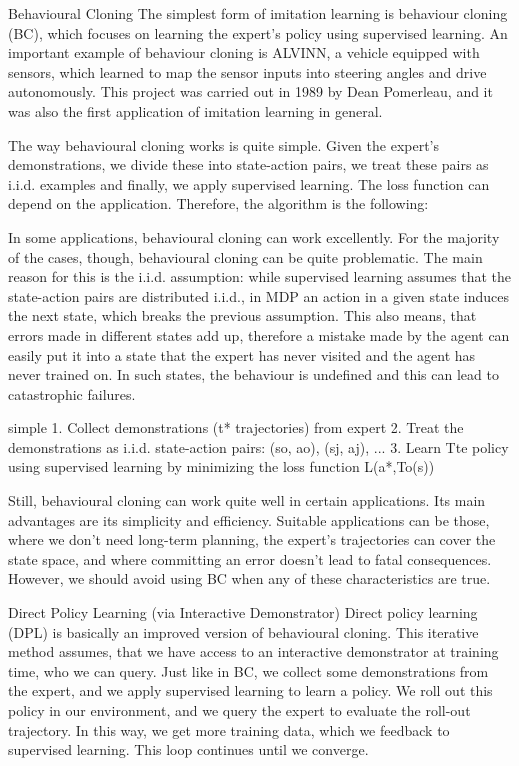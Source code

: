 \documentclass{article}
\begin{document}
Behavioural Cloning
The simplest form of imitation learning is behaviour cloning (BC), which focuses on learning the expert’s policy using supervised learning. An important example of behaviour cloning is ALVINN, a vehicle equipped with sensors, which learned to map the sensor inputs into steering angles and drive autonomously. This project was carried out in 1989 by Dean Pomerleau, and it was also the first application of imitation learning in general.

The way behavioural cloning works is quite simple. Given the expert’s demonstrations, we divide these into state-action pairs, we treat these pairs as i.i.d. examples and finally, we apply supervised learning. The loss function can depend on the application. Therefore, the algorithm is the following:

In some applications, behavioural cloning can work excellently. For the majority of the cases, though, behavioural cloning can be quite problematic. The main reason for this is the i.i.d. assumption: while supervised learning assumes that the state-action pairs are distributed i.i.d., in MDP an action in a given state induces the next state, which breaks the previous assumption. This also means, that errors made in different states add up, therefore a mistake made by the agent can easily put it into a state that the expert has never visited and the agent has never trained on. In such states, the behaviour is undefined and this can lead to catastrophic failures.

simple
1. Collect demonstrations (t* trajectories) from expert
2. Treat the demonstrations as i.i.d. state-action pairs: (so, ao), (sj, aj), ...
3. Learn Tte policy using supervised learning by minimizing the loss function
L(a*,To(s))

Still, behavioural cloning can work quite well in certain applications. Its main advantages are its simplicity and efficiency. Suitable applications can be those, where we don’t need long-term planning, the expert’s trajectories can cover the state space, and where committing an error doesn’t lead to fatal consequences. However, we should avoid using BC when any of these characteristics are true.

Direct Policy Learning (via Interactive Demonstrator)
Direct policy learning (DPL) is basically an improved version of behavioural cloning. This iterative method assumes, that we have access to an interactive demonstrator at training time, who we can query. Just like in BC, we collect some demonstrations from the expert, and we apply supervised learning to learn a policy. We roll out this policy in our environment, and we query the expert to evaluate the roll-out trajectory. In this way, we get more training data, which we feedback to supervised learning. This loop continues until we converge.
\end{document}
